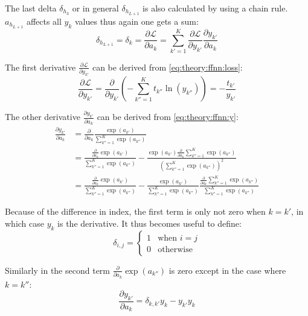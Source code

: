 The last delta $\delta_{h_3}$ or in general $\delta_{h_{L+1}}$ is also calculated by using a chain rule. $a_{h_{L+1}}$ affects all $y_k$ values thus again one gets a sum:
\begin{equation}
\delta_{h_{L + 1}} = \delta_k = \frac{\partial \mathcal{L}}{\partial a_k} = \sum_{k'=1}^K \frac{\partial \mathcal{L}}{\partial y_{k'}} \frac{\partial y_{k'}}{\partial a_k}
\label{eq:theory:ffnn:bprop-deltaK}
\end{equation}

The first derivative $\frac{\partial \mathcal{L}}{\partial y_{k'}}$ can be derived from \eqref{eq:theory:ffnn:loss}:
\begin{equation}
\frac{\partial \mathcal{L}}{\partial y_{k'}} = \frac{\partial}{\partial y_{k'}} \left(- \sum_{k''=1}^K t_{k''} \ln(y_{k''})\right) = -\frac{t_{k'}}{y_{k'}}
\label{eq:theory:ffnn:bprop-Ldy}
\end{equation}

The other derivative $\frac{\partial y_{k'}}{\partial a_k}$ can be derived from \eqref{eq:theory:ffnn:y}:
\begin{equation}
\begin{aligned}
\frac{\partial y_{k'}}{\partial a_k}
&= \frac{\partial}{\partial a_k} \frac{\exp(a_{k'})}{\sum_{k''=1}^K \exp(a_{k''})} \\
&= \frac{\frac{\partial}{\partial a_k} \exp(a_{k'})}{\sum_{k''=1}^K \exp(a_{k''})}
- \frac{\exp(a_{k'}) \frac{\partial}{\partial a_k} \sum_{k''=1}^K \exp(a_{k''})}{\left(\sum_{k''=1}^K \exp(a_{k''})\right)^2} \\
&= \frac{\frac{\partial}{\partial a_k} \exp(a_{k'})}{\sum_{k''=1}^K \exp(a_{k''})}
- \frac{\exp(a_{k'})}{\sum_{k''=1}^K \exp(a_{k''})} \frac{\frac{\partial}{\partial a_k} \sum_{k''=1}^K \exp(a_{k''})}{\sum_{k''=1}^K \exp(a_{k''})}
\end{aligned}
\end{equation}

Because of the difference in index, the first term is only not zero when $k = k'$, in which case $y_k$ is the derivative. It thus becomes useful to define:
\begin{equation}
\delta_{i,j} = \begin{cases}1& \text{when } i = j \\ 0 & \text{otherwise}\end{cases}
\end{equation}

Similarly in the second term $\frac{\partial}{\partial a_k} \exp(a_{k''})$ is zero except in the case where $k = k''$:
\begin{equation}
\frac{\partial y_{k'}}{\partial a_k} = \delta_{k, k'} y_k - y_{k'} y_k
\label{eq:theory:ffnn:bprop-yda}
\end{equation}

